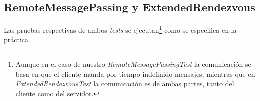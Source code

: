 \documentclass[12pt]{article}
\begin{document}
\subsection{RemoteMessagePassing y ExtendedRendezvous}
Las pruebas respectivas de ambos \textit{tests} se ejecutan\footnote{Aunque en el caso de nuestro \textit{RemoteMessagePassingTest} la comunicación se basa en que el cliente manda por tiempo indefinido mensajes, mientras que en \textit{ExtendedRendezvousTest} la comunicación es de ambas partes, tanto del cliente como del servidor.} como se especifica en la práctica.
\end{document}
